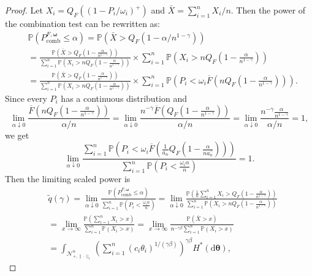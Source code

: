 \documentclass[12pt]{article}
\theoremstyle{plain}
\theoremstyle{plain}
\theoremstyle{definition}
\renewcommand{\Pr}{\mathbb{P}}
\newcommand{\intd}{\mathrm{d}}
\newcommand{\punitsphereone}[1]{\mathcal{N}_{+,\|\cdot\|_1}^{#1}}
\begin{document}
\begin{proof}
Let $X_i = Q_{F}((1-P_i/\omega_i)^+)$ and $\bar{X}=\sum_{i=1}^n X_i/n$. Then the power of the combination test can be rewritten as:
\begin{equation}
\label{eq:rewrite-power}
\begin{split}
&\Pr\left(P^{F,\bm{\omega}}_{\mathrm{comb}}\le\alpha\right)
=\Pr\left(\bar{X}>Q_F\left(1-{\alpha}/{n^{1-\gamma}}\right)\right)\\
&=\frac{\Pr\left(\bar{X}>Q_F\left(1-\frac{\alpha}{n^{1-\gamma}}\right)\right)}{\sum_{i=1}^n\Pr\left( X_i> n Q_F\left(1-\frac{\alpha}{n^{1-\gamma}}\right)\right)}\times\sum_{i=1}^n\Pr\left( X_i> n Q_F\left(1-\frac{\alpha}{n^{1-\gamma}}\right)\right)\\
&=\frac{\Pr\left(\bar{X}> Q_F\left(1-\frac{\alpha}{n^{1-\gamma}}\right)\right)}{\sum_{i=1}^n\Pr\left( X_i> n Q_F\left(1-\frac{\alpha}{n^{1-\gamma}}\right)\right)}\times\sum_{i=1}^n\Pr\left( P_i<\omega_i\overline{F}\left(nQ_F\left(1-\frac{\alpha}{n^{1-\gamma}}\right)\right)\right).
\end{split}
\end{equation}
Since every $P_i$ has a continuous distribution and 
\[
\lim_{\alpha\downarrow0}\frac{\overline{F}\left(nQ_F\left(1-\frac{\alpha}{n^{1-\gamma}}\right)\right)}{\alpha/n}
=\lim_{\alpha\downarrow0}\frac{n^{-\gamma}\overline{F}\left(Q_F\left(1-\frac{\alpha}{n^{1-\gamma}}\right)\right)}{\alpha/n}
=\lim_{\alpha\downarrow0}\frac{n^{-\gamma}\frac{\alpha}{n^{1-\gamma}}}{\alpha/n}
=1,
\]
we get
\begin{equation}
\label{eq:power-summation-individuals}
\lim_{\alpha\downarrow0}\frac{\sum_{i=1}^n\Pr\left( P_i<\omega_i\overline{F}\left(\frac{1}{a_n}Q_{F}\left(1-\frac{\alpha}{n a_n^\gamma}\right)\right)\right)}{\sum_{i=1}^n\Pr\left( P_i<\frac{\omega_i\alpha}{n}\right)}=1.
\end{equation}
Then the limiting scaled power is
\begin{align*}
&\tilde{q}(\gamma)
=\lim_{\alpha\downarrow0}\frac{\Pr\left(P^{F,\bm{\omega}}_{\mathrm{comb}}\le\alpha\right)}{\sum_{i=1}^n\Pr\left( P_i<\frac{\omega_i\alpha}{n}\right)}
=\lim_{\alpha\downarrow0}\frac{\Pr\left(\frac{1}{n}\sum_{i=1}^n X_i>Q_F\left(1-\frac{\alpha}{n^{1-\gamma}}\right)\right)}{\sum_{i=1}^n\Pr\left( X_i> n Q_F\left(1-\frac{\alpha}{n^{1-\gamma}}\right)\right)}\\
&=\lim_{x\to\infty}\frac{\Pr(\sum_{i=1}^n X_i>x)}{\sum_{i=1}^n\Pr(X_i>x)}=\lim_{x\to\infty}\frac{\Pr(\bar{X}>x)}{n^{-\gamma\beta}\sum_{i=1}^n\Pr(X_i>x)}\\
&=\int_{\punitsphereone{n}}\left(\sum_{i=1}^n(c_i\theta_i)^{1/(\gamma\beta)} \right)^{\gamma\beta}H^*(\intd\bm{\theta}),

\end{align*}
\end{proof}
\end{document}

